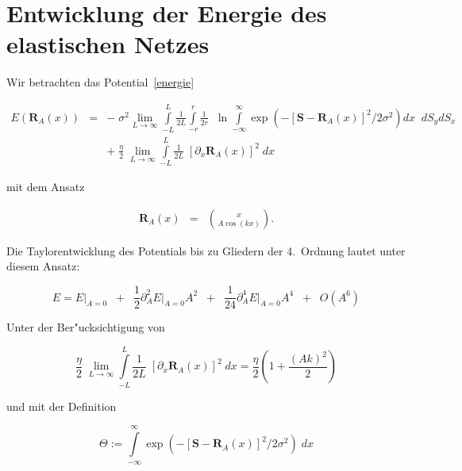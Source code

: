 \section{Entwicklung der Energie des elastischen Netzes}
\label{anhang1}
\thispagestyle{plain}

\noindent Wir betrachten das Potential~\eqref{energie}

\begin{small}
\begin{eqnarray}
E\left(\mathbf{R}_A(x)\right)&=&-\;\sigma^2\lim_{L\to\infty}\int\limits_{-L}^{L}\!\!\frac{1}{2L}\int\limits_{-r}^{r}\!\!\frac{1}{2r}\;\;\ln\!\!\int\limits_{-\infty}^{\infty}\!\!\!\exp\!\left(-[\mathbf{S}-\mathbf{R}_A(x)]^2/2\sigma^2\right)dx\;\;dS_y dS_x\nonumber\\
&&+\;\frac{\eta}{2}\;\lim_{L\to\infty}\int\limits_{-L}^{L}\!\!\frac{1}{2L}\;\left[\partial_x\mathbf{R}_A(x)\right]^2\;dx
\label{energieanh}
\end{eqnarray}
\end{small}

\noindent mit dem Ansatz

\begin{small}
\begin{eqnarray*}
\mathbf{R}_A(x)&=&{x\choose A\cos(kx)}.
\end{eqnarray*}
\end{small}

\noindent Die Taylorentwicklung des Potentials bis zu Gliedern der 4.~Ordnung lautet
unter diesem Ansatz:

\begin{small}
\begin{equation*}
E = E\big\vert_{A=0} \;\;+\;\;
\frac{1}{2}\partial_A^2E\big\vert_{A=0}A^2 \;\;+\;\;
\frac{1}{24}\partial_A^4E\big\vert_{A=0}A^4 \;\;+\;\; O(A^6) 
\end{equation*}
\end{small}

\noindent Unter der Ber"ucksichtigung von

\small
$$\frac{\eta}{2}\;\lim_{L\to\infty}\int\limits_{-L}^{L}\!\!\frac{1}{2L}\;\left[\partial_x\mathbf{R}_A(x)\right]^2\;dx = \frac{\eta}{2}\left(1+\frac{(Ak)^2}{2}\right)$$
\normalsize

\noindent und mit der Definition

\begin{small}
\begin{equation}
\Theta :=\int\limits_{-\infty}^{\infty}\!\!\!\exp\!\left(-[\mathbf{S}-\mathbf{R}_A(x)]^2/2\sigma^2\right)\;dx
\label{theta}
\end{equation}
\end{small}

